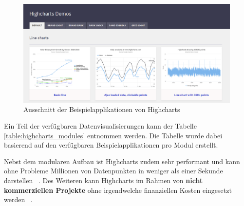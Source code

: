\begin{figure}[h]
    \includegraphics[width=12cm]{images/highcharts_demo.png}
    \centering
    \caption{Ausschnitt der Beispielapplikationen von Highcharts ~\citep{highcharts_demo}}
    \label{fig:highcharts_demo}
\end{figure}


 Ein Teil der verfügbaren Datenvisualisierungen kann der Tabelle \ref{table:highcharts_modules} entnommen werden. Die Tabelle wurde dabei basierend auf den verfügbaren Beispielapplikationen pro Modul erstellt.

\begin{table}[h]
\centering
{}
\caption{Ausschnitt der verfügbaren Visualisierungsarten pro Highcharts Modul (Eigene Darstellung)}
\label{table:highcharts_modules}
\end{table}

Nebst dem modularen Aufbau ist Highcharts zudem sehr performant und kann ohne Probleme Millionen von Datenpunkten in weniger als einer Sekunde darstellen ~\citep{highcharts_fast_rendering}. Des Weiteren kann Highcharts im Rahmen von \textbf{nicht kommerziellen Projekte} ohne irgendwelche finanziellen Kosten eingesetzt werden ~\citep{highcharts_free}.